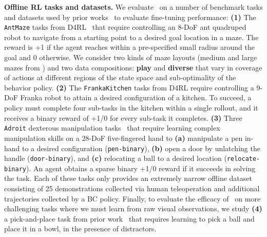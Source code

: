 \textbf{Offline RL tasks and datasets.} We evaluate \methodname\ on a number of benchmark tasks and datasets used by prior works~\cite{kostrikov2021offlineb,nair2020accelerating} to evaluate fine-tuning performance: \textbf{(1)} The {\texttt{AntMaze}} tasks from D4RL~\cite{fu2020d4rl} that require controlling an 8-DoF ant quadruped robot to navigate from a starting point to a desired goal location in a maze. The reward is +1 if the agent reaches within a pre-specified small radius around the goal and 0 otherwise. We consider two kinds of maze layouts (medium and large mazes from \cite{fu2020d4rl}) and two data compositions: \textbf{play} and \textbf{diverse} that vary in coverage of actions at different regions of the state space and sub-optimality of the behavior policy. \textbf{(2)} The \texttt{FrankaKitchen} tasks from D4RL require controlling a 9-DoF Franka robot to attain a desired configuration of a kitchen. To succeed, a policy 
must complete four sub-tasks in the kitchen within a single rollout, and it receives a binary reward of +1/0 for every sub-task it completes. \textbf{(3)} Three \texttt{Adroit} dexterous manipulation tasks~\cite{rajeswaran2018dapg,kostrikov2021offlineb,nair2020accelerating} that require learning complex manipulation skills on a 28-DoF five-fingered hand to \textbf{(a)} manipulate a pen in-hand to a desired configuration (\texttt{pen-binary}), \textbf{(b)} open a door by unlatching the handle (\texttt{door-binary}), and \textbf{(c)} relocating a ball to a desired location (\texttt{relocate-binary}). An agent obtains a sparse binary +1/0 reward if it succeeds in solving the task. Each of these tasks only provides an extremely narrow offline dataset consisting of 25 demonstrations collected via human teleoperation and additional trajectories collected by a BC policy.
Finally, to evaluate the efficacy of \methodname\ on more challenging tasks where we must learn from raw visual observations, we study \textbf{(4)} a pick-and-place task from prior work~\cite{singh2020cog,kumar2022pre} that requires learning to pick a ball and place it in a bowl, in the presence of distractors.

\fi

